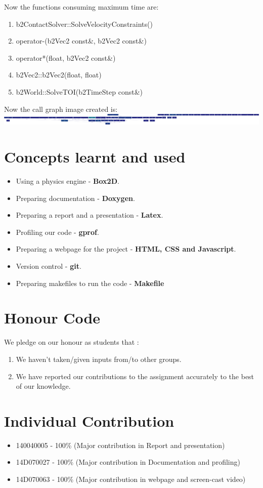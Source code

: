 \documentclass{report}
\begin{document}
Now the functions consuming maximum time are:
\begin{enumerate}
\item b2ContactSolver::SolveVelocityConstraints()
\item operator-(b2Vec2 const\&, b2Vec2 const\&)
\item operator*(float, b2Vec2 const\&)
\item b2Vec2::b2Vec2(float, float)
\item b2World::SolveTOI(b2TimeStep const\&)
\end{enumerate}

Now the call graph image created is:\\
\includegraphics[scale=0.05]{performancenew}\\

\section{Concepts learnt and used}
\begin{itemize}
\item Using a physics engine - \textbf{Box2D}.
\item Preparing documentation - \textbf{Doxygen}.
\item Preparing a report and a presentation - \textbf{Latex}.
\item Profiling our code - \textbf{gprof}.
\item Preparing a webpage for the project - \textbf{HTML, CSS and Javascript}.
\item Version control - \textbf{git}.
\item Preparing makefiles to run the code - \textbf{Makefile}
\end{itemize}

\section{Honour Code}
We pledge on our honour as students that : 
\begin{enumerate}
\item We haven't taken/given inputs from/to other groups.
\item We have reported our contributions to the assignment accurately to the best of our knowledge.
\end{enumerate}

\section{Individual Contribution}
\begin{itemize}
\item 140040005 - 100\% (Major contribution in Report and presentation)
\item 14D070027 - 100\% (Major contribution in Documentation and profiling)
\item 14D070063 - 100\% (Major contribution in webpage and screen-cast video)
\end{itemize}

\printbibliography
\end{document}
